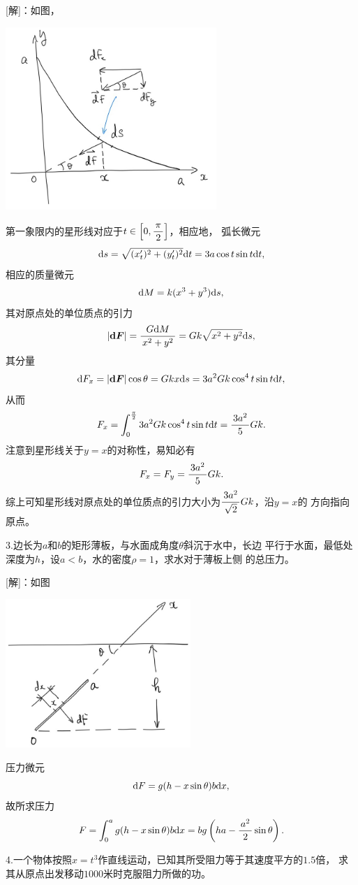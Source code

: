 [解]：如图，
\begin{center}
	\includegraphics[width=8cm]{./images/ch6/starGr.jpg}
\end{center}
第一象限内的星形线对应于$t\in\left[0,\displaystyle\frac{\,{\pi}\,}{\,{2}\,}\right]$，相应地，
弧长微元
$$\mathrm{d} s=\sqrt{(x'_t)^2+(y'_t)^2}\mathrm{d} t=3a\cos t\sin t\mathrm{d} t,$$
相应的质量微元
$$\mathrm{d} M=k(x^3+y^3)\mathrm{d} s,$$
其对原点处的单位质点的引力
$$|\bm{\mathrm{d} F}|=\displaystyle\frac{\,{G\mathrm{d} M}\,}{\,{x^2+y^2}\,}=Gk\sqrt{x^2+y^2}\mathrm{d} s,$$
其分量
$$\mathrm{d} F_x=|\bm{\mathrm{d} F}|\cos\theta=Gkx\mathrm{d} s
=3a^2Gk\cos^4t\sin t\mathrm{d} t,$$
从而
$$F_x=\displaystyle\int_0^{\frac{\pi}2}3a^2Gk\cos^4t\sin t\mathrm{d} t=\displaystyle\frac{\,{3a^2}\,}{\,{5}\,}Gk.$$
注意到星形线关于$y=x$的对称性，易知必有
$$F_x=F_y=\displaystyle\frac{\,{3a^2}\,}{\,{5}\,}Gk.$$
综上可知星形线对原点处的单位质点的引力大小为$\displaystyle\frac{\,{3a^2}\,}{\,{\sqrt2}\,}Gk$，沿$y=x$的
方向指向原点。\fin

\bs

3.边长为$a$和$b$的矩形薄板，与水面成角度$\theta$斜沉于水中，长边
平行于水面，最低处深度为$h$，设$a<b$，水的密度$\rho=1$，求水对于薄板上侧
的总压力。

[解]：如图
\begin{center}
	\includegraphics[width=7cm]{./images/ch6/waterPlane.jpg}
\end{center}
压力微元
$$\mathrm{d} F=g(h-x\sin\theta)b\mathrm{d} x,$$
故所求压力
$$F=\displaystyle\int_0^ag(h-x\sin\theta)b\mathrm{d} x
=bg\left(ha-\displaystyle\frac{\,{a^2}\,}{\,{2}\,}\sin\theta\right).$$
\fin

4.一个物体按照$x=t^3$作直线运动，已知其所受阻力等于其速度平方的$1.5$倍，
求其从原点出发移动$1000$米时克服阻力所做的功。

